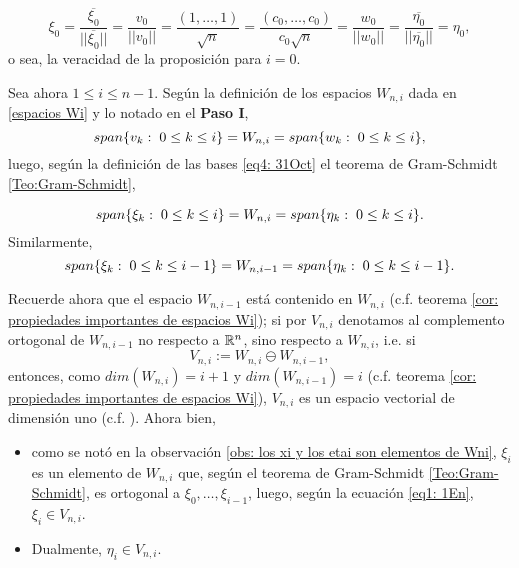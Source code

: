 \begin{itemize}
\[
\xi_{0}=
\frac{\overline{\xi_{0}}}{||\overline{\xi_{0}}||}=
\frac{v_{0}}{||v_{0}||}=\frac{(1, \ldots , 1)}{\sqrt{n}}=
\frac{(c_{0}, \ldots , c_{0})}{c_{0}\sqrt{n}}= \frac{w_{0}}{||w_{0}||}=
\frac{\overline{\eta_{0}}}{||\overline{\eta_{0}}||}=\eta_{0},
\]
o sea, la veracidad de la proposición para $i=0$.



Sea ahora $1 \leq i \leq n-1$.
Según la definición de los espacios
$W_{n,i}$ dada en \eqref{espacios Wi}
y lo notado en el \textbf{Paso I},
\[
span\{ v_{k}: \hspace{0.1cm} 0 \leq k \leq i \}=W_{n,i}=
span\{ w_{k}: \hspace{0.1cm} 0 \leq k \leq i \},
\]
luego, según la definición de las bases
\eqref{eq4: 31Oct}
el teorema de Gram-Schmidt
\ref{Teo:Gram-Schmidt},

\[
span\{ \xi_{k}: \hspace{0.1cm} 0 \leq k \leq i \}=
W_{n,i} =span\{ \eta_{k}: \hspace{0.1cm} 0 \leq k \leq i \}.
\]
\noindent
Similarmente,
\[
span\{ \xi_{k}: \hspace{0.1cm} 0 \leq k \leq i-1 \}=
W_{n,i-1} =span\{ \eta_{k}: \hspace{0.1cm} 0 \leq k \leq i-1 \}.
\]

Recuerde ahora que el espacio $W_{n,i-1}$
está contenido en $W_{n,i}$
(c.f. teorema \ref{cor: propiedades importantes de espacios Wi});
si por $V_{n,i}$ denotamos al complemento ortogonal de $W_{n,i-1}$
no respecto a $\mathbb{R}^{n}$, sino 
respecto a $W_{n,i}$, i.e. si
\begin{equation}
\label{eq1: 1En}
V_{n,i} := W_{n,i} \ominus W_{n,i-1},
\end{equation}
entonces, como 
$dim(W_{n,i})=i+1$ y $dim(W_{n,i-1})=i$
(c.f. teorema \ref{cor: propiedades importantes de espacios Wi}), 
$V_{n,i}$ es un espacio
vectorial de dimensión uno
(c.f. ). Ahora bien,

\begin{itemize}
\item como se notó en la observación 
\ref{obs: los xi y los etai son elementos de Wni},
$\xi_{i}$ es un elemento de $W_{n,i}$ que,
según el teorema de Gram-Schmidt \ref{Teo:Gram-Schmidt},
es ortogonal
a $\xi_{0}, \ldots , \xi_{i-1}$, luego, 
según la ecuación \eqref{eq1: 1En},
$\xi_{i} \in V_{n,i}$.

\item Dualmente, $\eta_{i} \in V_{n,i}$.
\end{itemize}


\end{itemize}

